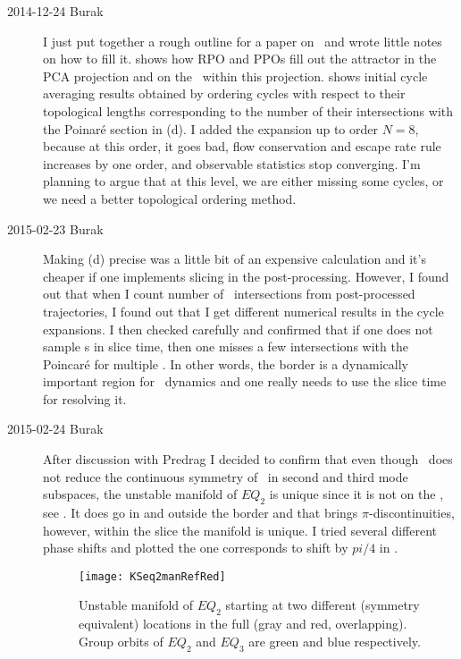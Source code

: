 \begin{description}
\item[2014-12-24 Burak] I just put together a rough outline for a paper on
\KSe\ and wrote little notes on how to fill it.  shows how
RPO and PPOs fill out the attractor in the PCA projection and on the
\PoincSec\ within this projection. 
shows initial cycle averaging results obtained by ordering cycles with
respect to their topological lengths corresponding to the number of their
intersections with the Poinar\'e section in  (d). I added the
expansion up to order $N=8$, because at this order, it goes bad, flow
conservation and escape rate rule increases by one order, and observable
statistics stop converging. I'm planning to argue that at this level, we
are either missing some cycles, or we need a better topological ordering
method.

\item[2015-02-23 Burak] Making  (d) precise was a
little bit of an expensive calculation and it's cheaper if one
implements slicing in the post-processing. However, I found out that
when I count number of \PoincSec\ intersections from
post-processed trajectories, I found out that I get different
numerical results in the cycle expansions. I then checked carefully
and confirmed that if one does not sample \po s in slice time, then
one misses a few intersections with the Poincar\'e for multiple \po .
In other words, the border is a dynamically important region for
\KS\ dynamics and one really needs to use the slice time for
resolving it.

\item[2015-02-24 Burak] After discussion with Predrag I decided to
confirm that even though \fFslice\ does not reduce the continuous
symmetry of \eqva\ in second and third mode subspaces, the unstable
manifold of $EQ_2$ is unique since it is not on the \sliceBord ,
see . It does go in and outside the border
and that brings $\pi$-discontinuities, however, within the slice
the manifold is unique. I tried several different phase shifts and
plotted the one corresponds to shift by $pi/4$ in
.

\begin{figure}[ht]
\begin{center}
\texttt{[image: KSeq2manRefRed]}
\end{center}
\caption[]{
Unstable manifold of $EQ_2$ starting at two different (symmetry
equivalent) locations in the full \statesp (gray and red,
overlapping). Group orbits of $EQ_2$ and $EQ_3$ are green and blue
respectively.
}
\label{f-KSeq2manRefRed}
\end{figure}



\end{description}
